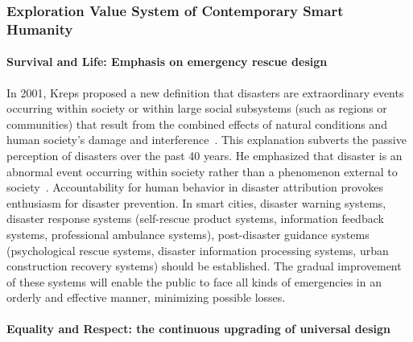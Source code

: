 \documentclass[letterpaper, twocolumn, 10pt, conference]{IEEEtran}
\begin{document}
\subsubsection{Exploration Value System of Contemporary Smart Humanity}
\label{sssec:css:smart_humanity:explore}

\paragraph{Survival and Life: Emphasis on emergency rescue design}

In 2001, Kreps proposed a new definition that disasters are extraordinary events occurring within society or within large social subsystems (such as regions or communities) that result from the combined effects of natural conditions and human society's damage and interference~\cite{kreps2001sociology}. This explanation subverts the passive perception of disasters over the past 40 years. He emphasized that disaster is an abnormal event occurring within society rather than a phenomenon external to society~\cite{sun2014development}. Accountability for human behavior in disaster attribution provokes enthusiasm for disaster prevention. In smart cities, disaster warning systems, disaster response systems (self-rescue product systems, information feedback systems, professional ambulance systems), post-disaster guidance systems (psychological rescue systems, disaster information processing systems, urban construction recovery systems) should be established. The gradual improvement of these systems will enable the public to face all kinds of emergencies in an orderly and effective manner, minimizing possible losses.

\paragraph{Equality and Respect: the continuous upgrading of universal design}
\end{document}
